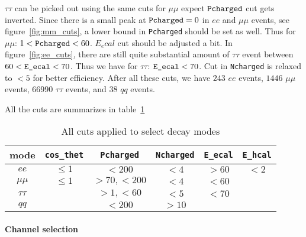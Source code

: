 $\tau\tau$ can be picked out using the same cuts for $\mu\mu$ expect $\verb|Pcharged|$ cut gets inverted. Since there is a small peak at $\verb|Pcharged| = 0$ in $ee$ and $\mu\mu$ events, see figure~\ref{fig:mm_cuts}, a lower bound in \verb|Pcharged| should be set as well. Thus for $\mu\mu$: $1< \verb|Pcharged| < 60$. $E_ecal$ cut should be adjusted a bit. In figure~\ref{fig:ee_cuts}, there are still quite substantial amount of $\tau\tau$ event between $60 < \verb|E_ecal| < 70$. Thus we have for $\tau\tau$: $\verb|E_ecal| < 70$. Cut in \verb|Ncharged| is relaxed to $<5$ for better efficiency. After all these cuts, we have $243$ $ee$ events, $1446$ $\mu\mu$ events, $66990$ $\tau\tau$ events, and $38$ $qq$ events.

All the cuts are summarizes in table~\ref{tab:cuts_all}
\begin{table}[ht]
	\centering
	\begin{tabular}{cccccc}
		\toprule
	mode & \verb|cos_thet| & \verb|Pcharged| & \verb|Ncharged| & \verb|E_ecal| & \verb|E_hcal| \\
	\midrule
	$ee$ & $\leq 1$ & $< 200$ & $< 4$ & $>60$ & $< 2$ \\
	$\mu\mu$ & $\leq 1$ & $>70, <200$ & $<4$ & $<60$ & \\
	$\tau\tau$ & & $>1, <60$ & $<5$ & $<70$ \\
	$qq$ & & $<200$ & $>10$ & & \\
	\bottomrule
	\end{tabular}
	\caption{All cuts applied to select decay modes}
	\label{tab:cuts_all}
\end{table}

\paragraph{Channel selection}
